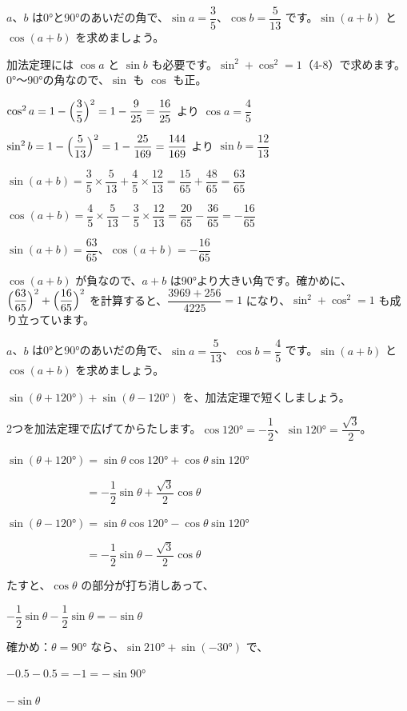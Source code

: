 \begin{reidai}
$a$、$b$ は0°と90°のあいだの角で、$\sin a=\dfrac35$、$\cos b=\dfrac{5}{13}$ です。$\sin(a+b)$ と $\cos(a+b)$ を求めましょう。\par
\kangaekata 加法定理には $\cos a$ と $\sin b$ も必要です。$\sin^2+\cos^2=1$（4-8）で求めます。0°〜90°の角なので、$\sin$ も $\cos$ も正。\par
\shiki{}\zw{} $\cos^2a=1-\Bigl(\dfrac35\Bigr)^2=1-\dfrac{9}{25}=\dfrac{16}{25}$ より $\cos a=\dfrac45$\par
\bkivja $\sin^2b=1-\Bigl(\dfrac{5}{13}\Bigr)^2=1-\dfrac{25}{169}=\dfrac{144}{169}$ より $\sin b=\dfrac{12}{13}$\par
\bkivja $\sin(a+b)=\dfrac35\times\dfrac{5}{13}+\dfrac45\times\dfrac{12}{13}=\dfrac{15}{65}+\dfrac{48}{65}=\dfrac{63}{65}$\par
\bkivja $\cos(a+b)=\dfrac45\times\dfrac{5}{13}-\dfrac35\times\dfrac{12}{13}=\dfrac{20}{65}-\dfrac{36}{65}=-\dfrac{16}{65}$\par
\kotae{}\zw{} $\sin(a+b)=\dfrac{63}{65}$、$\cos(a+b)=-\dfrac{16}{65}$
\end{reidai}
$\cos(a+b)$ が負なので、$a+b$ は90°より大きい角です。確かめに、$\Bigl(\dfrac{63}{65}\Bigr)^2+\Bigl(\dfrac{16}{65}\Bigr)^2$ を計算すると、$\dfrac{3969+256}{4225}=1$ になり、$\sin^2+\cos^2=1$ も成り立っています。

\begin{jibun}
$a$、$b$ は0°と90°のあいだの角で、$\sin a=\dfrac{5}{13}$、$\cos b=\dfrac45$ です。$\sin(a+b)$ と $\cos(a+b)$ を求めましょう。
\end{jibun}

\begin{reidai}[加法定理で式を短くする]
$\sin(\theta+120°)+\sin(\theta-120°)$ を、加法定理で短くしましょう。\par
\kangaekata 2つを加法定理で広げてからたします。$\cos120°=-\dfrac12$、$\sin120°=\dfrac{\sqrt3}{2}$。\par
\shiki{}\zw{} $\sin(\theta+120°)=\sin\theta\cos120°+\cos\theta\sin120°$\par
\bkivja $\phantom{\sin(\theta+120°)}=-\dfrac12\sin\theta+\dfrac{\sqrt3}{2}\cos\theta$\par
\bkivja $\sin(\theta-120°)=\sin\theta\cos120°-\cos\theta\sin120°$\par
\bkivja $\phantom{\sin(\theta-120°)}=-\dfrac12\sin\theta-\dfrac{\sqrt3}{2}\cos\theta$\par
\bkivja たすと、$\cos\theta$ の部分が打ち消しあって、\par
\bkivja $-\dfrac12\sin\theta-\dfrac12\sin\theta=-\sin\theta$\par
\bkivja 確かめ：$\theta=90°$ なら、$\sin210°+\sin(-30°)$ で、\par
\bkivja $-0.5-0.5=-1=-\sin90°$\par
\kotae{}\zw{} $-\sin\theta$
\end{reidai}

